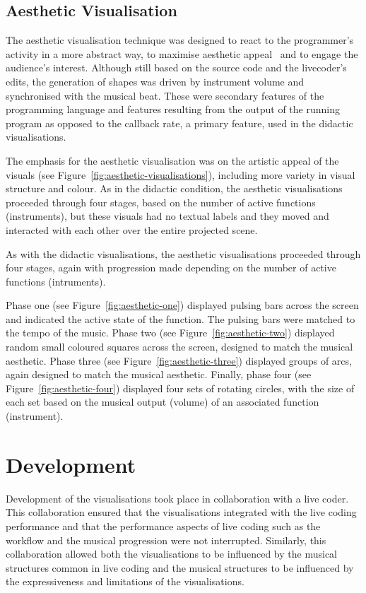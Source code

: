 \subsection{Aesthetic Visualisation}
\label{sec:aesthetic-visualisation}

The aesthetic visualisation technique was designed to react to the programmer's activity in a more abstract way, to maximise aesthetic appeal~\cite{Cawthon2007} and to engage the audience's interest. Although still based on the source code and the livecoder's edits, the generation of shapes was driven by instrument volume and synchronised with the musical beat. These were secondary features of the programming language and features resulting from the output of the running program as opposed to the callback rate, a primary feature, used in the didactic visualisations.

The emphasis for the aesthetic visualisation was on the artistic appeal of the visuals (see Figure~\ref{fig:aesthetic-visualisations}), including more variety in visual structure and colour. As in the didactic condition, the aesthetic visualisations proceeded through four stages, based on the number of active functions (instruments), but these visuals had no textual labels and they moved and interacted with each other over the entire projected scene.

As with the didactic visualisations, the aesthetic visualisations proceeded through four stages, again with progression made depending on the number of active functions (intruments).

Phase one (see Figure~\ref{fig:aesthetic-one}) displayed pulsing bars across the screen and indicated the active state of the function. The pulsing bars were matched to the tempo of the music. Phase two (see Figure~\ref{fig:aesthetic-two}) displayed random small coloured squares across the screen, designed to match the musical aesthetic. Phase three (see Figure~\ref{fig:aesthetic-three}) displayed groups of arcs, again designed to match the musical aesthetic. Finally, phase four (see Figure~\ref{fig:aesthetic-four}) displayed four sets of rotating circles, with the size of each set based on the musical output (volume) of an associated function (instrument).

\section{Development}

Development of the visualisations took place in collaboration with a live coder. This collaboration ensured that the visualisations integrated with the live coding performance and that the performance aspects of live coding such as the workflow and the musical progression were not interrupted. Similarly, this collaboration allowed both the visualisations to be influenced by the musical structures common in live coding and the musical structures to be influenced by the expressiveness and limitations of the visualisations.

